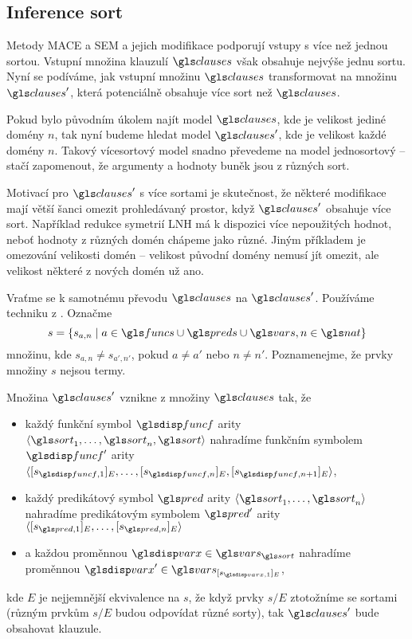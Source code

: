 \subsection{Inference sort}

Metody MACE a SEM a jejich modifikace podporují vstupy s více než
jednou sortou. Vstupní množina klauzulí $\clauses$ však obsahuje
nejvýše jednu sortu. Nyní se podíváme, jak vstupní množinu
$\clauses$ transformovat
na množinu $\clauses'$, která potenciálně
obsahuje více sort než $\clauses$.

Pokud bylo původním úkolem najít model $\clauses$, kde je velikost
jediné domény $n$, tak nyní budeme hledat model $\clauses'$,
kde je velikost každé domény $n$. Takový vícesortový
model snadno převedeme na model jednosortový -- stačí zapomenout,
že argumenty a hodnoty buněk jsou z různých sort.

Motivací pro $\clauses'$ s více sortami je skutečnost,
že některé modifikace mají větší šanci omezit prohledávaný prostor,
když $\clauses'$ obsahuje více sort. Například
redukce symetrií LNH má k dispozici více nepoužitých hodnot,
neboť hodnoty z různých domén chápeme jako různé.
Jiným příkladem je omezování velikosti domén -- velikost původní domény
nemusí jít omezit, ale velikost některé z nových domén už ano.

Vraťme se k samotnému převodu $\clauses$ na $\clauses'$.
Používáme techniku z \cite{claessen03paradox}.
Označme
\[
  s = \{ s_{a, n} \mid  a \in \funcs \cup \preds \cup \vars, n \in \nat\}
\]
množinu, kde
$s_{a, n} \neq s_{a', n'}$, pokud $a \neq a'$ nebo $n \neq n'$.
Poznamenejme, že prvky množiny $s$ nejsou termy.

Množina $\clauses'$ vznikne z množiny $\clauses$ tak, že
\begin{itemize}
\item každý funkční symbol $\func$ arity
  $\langle \sort_1 \comdots \sort_n, \sort \rangle$
  nahradíme funkčním symbolem $\func'$ arity
  $\langle [s_{\func, 1}]_E \comdots [s_{\func, n}]_E, [s_{\func, n + 1}]_E \rangle$,
\item každý predikátový symbol $\pred$ arity
  $\langle \sort_1 \comdots \sort_n \rangle$
  nahradíme predikátovým symbolem $\pred'$ arity
  $\langle [s_{\pred, 1}]_E \comdots [s_{\pred, n}]_E \rangle$
\item a každou proměnnou $\var \in \vars_\sort$ nahradíme
  proměnnou $\var' \in \vars_{[s_{\var, 1}]_E}$,
\end{itemize}
kde $E$ je nejjemnější ekvivalence na $s$, že když prvky $s/E$
ztotožníme se sortami (různým prvkům $s/E$ budou odpovídat různé sorty),
tak $\clauses'$ bude obsahovat klauzule.

